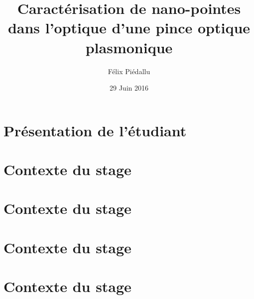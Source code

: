 \documentclass[10pt,a9paper,handout]{beamer}
\title{Caractérisation de nano-pointes dans l'optique d'une pince optique plasmonique}
\author{Félix Piédallu}
\date{29 Juin 2016}
\institute{Institut Néel - Équipe NanoOptique et Forces}
\begin{document}
\begin{frame}
  \titlepage
\end{frame}


\section{Présentation de l'étudiant}
\begin{frame}

\end{frame}


\section{Contexte du stage}
\begin{frame}

\end{frame}


\section{Contexte du stage}
\begin{frame}

\end{frame}


\section{Contexte du stage}
\begin{frame}

\end{frame}


\section{Contexte du stage}
\begin{frame}

\end{frame}
\end{document}
